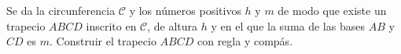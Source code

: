 Se da la circunferencia $\mathcal C$ y los números positivos $h$ y $m$ de modo que existe un trapecio $ABCD$ inscrito en $\mathcal C$, de altura $h$ y en el que la suma de las bases $AB$ y $CD$ es $m$. Construir el trapecio $ABCD$ con regla y compás.